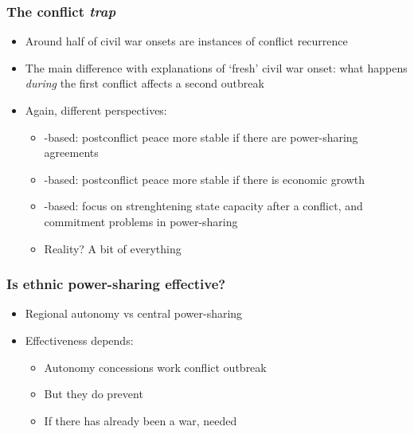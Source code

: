\documentclass[aspectratio=43]{beamer}
\begin{document}



\begin{frame}
\frametitle{The conflict \textit{trap}}
\centering

\begin{itemize}[<+->]
  \item Around half of civil war onsets are instances of conflict recurrence
  \item The main difference with explanations of `fresh' civil war onset: what happens \textit{during} the first conflict affects a second outbreak
  \item Again, different perspectives:
  \begin{itemize}
    \item {\color{red}{Grievance}}-based: postconflict peace more stable if there are power-sharing agreements
    \item {\color{red}{Greed}}-based: postconflict peace more stable if there is economic growth
    \item {\color{red}{Opportunity}}-based: focus on strenghtening state capacity after a conflict, and commitment problems in power-sharing
    \item Reality? A bit of everything
  \end{itemize}
\end{itemize}

\end{frame}

\begin{frame}
\frametitle{Is ethnic power-sharing effective?}
\centering

\begin{itemize}[<+->]
  \item Regional autonomy vs central power-sharing
  \item Effectiveness depends:
  \begin{itemize}
    \item Autonomy concessions work {\color{red}{before}} conflict outbreak
    \item But they do {\color{red}{not}} prevent {\color{red}{recurrence}}
    \item If there has already been a war, {\color{red}{central power-sharing}} needed
  \end{itemize}
\end{itemize}

\end{frame}
\end{document}
